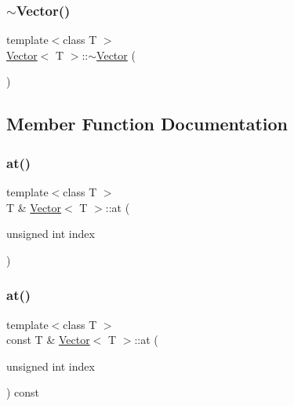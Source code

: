 \mbox{\label{classVector_afd524fac19e6d3d69db5198ffe2952b0_afd524fac19e6d3d69db5198ffe2952b0}} 
\subsubsection{\texorpdfstring{$\sim$\+Vector()}{~Vector()}}
{\footnotesize\ttfamily template$<$class T $>$ \\
\hyperlink{classVector}{Vector}$<$ T $>$\+::$\sim$\hyperlink{classVector}{Vector} (\begin{DoxyParamCaption}{ }\end{DoxyParamCaption})}



\subsection{Member Function Documentation}
\mbox{\label{classVector_a3ae75814fa1b993c0abfd82aa513b5b3_a3ae75814fa1b993c0abfd82aa513b5b3}} 
\subsubsection{\texorpdfstring{at()}{at()}\hspace{0.1cm}{\footnotesize\ttfamily [1/2]}}
{\footnotesize\ttfamily template$<$class T $>$ \\
T \& \hyperlink{classVector}{Vector}$<$ T $>$\+::at (\begin{DoxyParamCaption}\item[{unsigned int}]{index }\end{DoxyParamCaption})}

\mbox{\label{classVector_a6287b84b91705e9caf0f3f197cc7e041_a6287b84b91705e9caf0f3f197cc7e041}} 
\subsubsection{\texorpdfstring{at()}{at()}\hspace{0.1cm}{\footnotesize\ttfamily [2/2]}}
{\footnotesize\ttfamily template$<$class T $>$ \\
const T \& \hyperlink{classVector}{Vector}$<$ T $>$\+::at (\begin{DoxyParamCaption}\item[{unsigned int}]{index }\end{DoxyParamCaption}) const}

